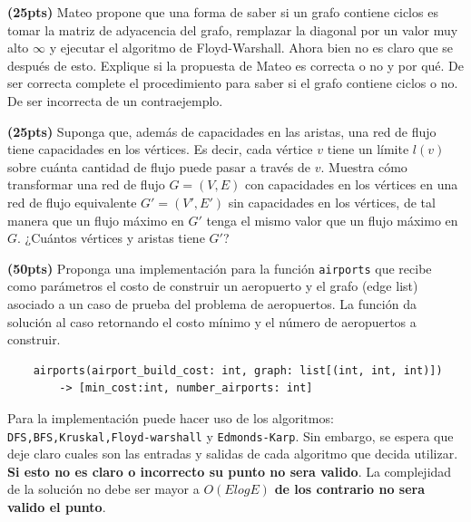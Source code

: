 \documentclass[12pt, a4paper]{exam}
\begin{document}
\begin{questions}
	\pointsdroppedatright

	\question \textbf{(25pts)} Mateo propone que una forma de saber si un grafo contiene
	ciclos es tomar la matriz de adyacencia del grafo, remplazar la diagonal por un valor
	muy alto $\infty$ y ejecutar el algoritmo de Floyd-Warshall. Ahora bien no es claro
	que se después de esto. Explique si la propuesta de Mateo es correcta o no y por qué.
	De ser correcta complete el procedimiento para saber si el grafo contiene ciclos o no.
	De ser incorrecta de un contraejemplo.
	
	\question \textbf{(25pts)} Suponga que, además de capacidades en las aristas, una red
	de flujo tiene capacidades en los vértices. Es decir, cada vértice \(v\) tiene un
	límite \(l(v)\) sobre cuánta cantidad de flujo puede pasar a través de \(v\). Muestra
	cómo transformar una red de flujo \(G = (V, E)\) con capacidades en los vértices en
	una red de flujo equivalente \(G' = (V', E')\) sin capacidades en los vértices, de tal
	manera que un flujo máximo en \(G'\) tenga el mismo valor que un flujo máximo en
	\(G\). ¿Cuántos vértices y aristas tiene \(G'\)?




	\question \textbf{(50pts)} Proponga una implementación para la función \verb|airports|
	que recibe como parámetros el costo de construir un aeropuerto y el grafo (edge list) 
	asociado a un caso de prueba del problema de aeropuertos. La función da
	solución al caso retornando el costo mínimo y el número de aeropuertos a construir. 


	\begin{lstlisting}
	airports(airport_build_cost: int, graph: list[(int, int, int)]) 
		-> [min_cost:int, number_airports: int]
	\end{lstlisting}

	Para la implementación puede hacer uso de los algoritmos:
	\verb|DFS,BFS,Kruskal,Floyd-warshall| y \verb|Edmonds-Karp|. Sin embargo, se espera
	que deje claro cuales son las entradas y salidas de cada algoritmo que decida
	utilizar. \textbf{Si esto no es claro o incorrecto su punto no sera valido}. La
	complejidad de la solución no debe ser mayor a $O(ElogE)$ \textbf{de los contrario no
	sera valido el punto}. 
	
	

\end{questions}

\end{document}
